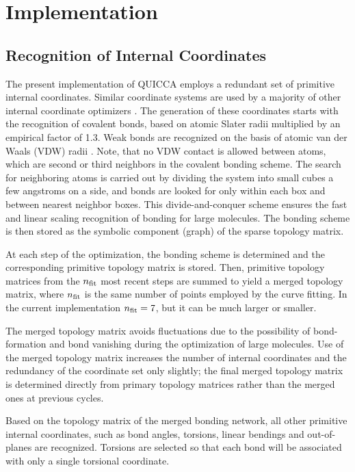 \documentclass[prl,aps,preprint,showpacs,superbib]{revtex4}
\begin{document}
\section{Implementation}\label{implementation}

\subsection{Recognition of Internal Coordinates} \label{recognition}

The present implementation of QUICCA employs a redundant set of primitive internal 
coordinates. Similar coordinate systems are used by a majority of other internal coordinate optimizers 
\cite{Pulay_natural_internals,fogarasi_diaghess,bakerstest,eckert,schlegel_on2iter}.  
The generation of these coordinates starts with the recognition of covalent bonds, 
based on atomic Slater radii \cite{SlaterRad}  multiplied by an empirical factor of 1.3. 
Weak bonds are recognized on the basis of atomic van der Waals (VDW) radii \cite{JMOLtable}.
Note, that no VDW contact is allowed between atoms, which are second or third neighbors in the 
covalent bonding scheme.  The search for neighboring atoms is carried out by dividing 
the system into small cubes a few angstroms on a side, and bonds are looked for only within 
each box and between nearest neighbor boxes.  This divide-and-conquer scheme ensures the fast 
and linear scaling recognition of bonding for large molecules.   The bonding scheme is then 
stored as the symbolic component (graph) of the sparse topology matrix.

At each step of the optimization, the  bonding scheme is determined and the corresponding 
primitive topology matrix is stored.  Then, primitive topology matrices from the 
$n_{\rm fit}$ most  recent steps are summed to yield a merged topology matrix, where 
$n_{\rm fit}$ is the same number of points employed by the curve fitting.   
In the current implementation $n_{\rm fit}=7$, but it can be much larger or smaller.  

The merged topology matrix avoids fluctuations due to the possibility of bond-formation and 
bond vanishing during the optimization of large molecules.  Use of the merged topology matrix
increases the number of internal coordinates and the redundancy of the coordinate set only slightly;
the final merged topology matrix is determined directly from primary topology matrices rather 
than the merged ones at previous cycles.

Based on the topology matrix of the merged bonding network, all other primitive 
internal coordinates, such as bond angles, torsions, linear bendings and 
out-of-planes are recognized. Torsions are selected so that each bond will be 
associated with only a single torsional coordinate.
\end{document}
